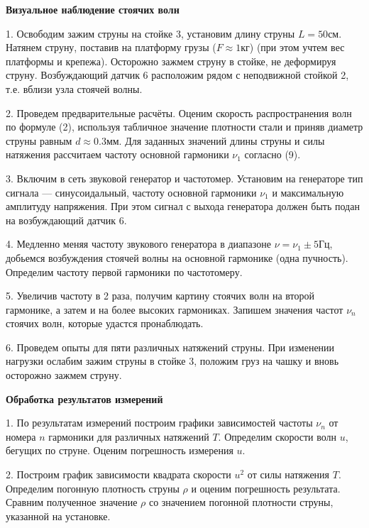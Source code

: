 \documentclass[14pt]{article}
\begin{document}
%
%

\vspace{1cm}
\textbf{Визуальное наблюдение стоячих волн}

1. Освободим зажим струны на стойке 3, установим длину струны $L = 50$см. Натянем струну, поставив на платформу грузы ($F \approx 1$кг) (при этом учтем вес платформы и крепежа). Осторожно зажмем струну в стойке, не деформируя струну. Возбуждающий датчик 6 расположим рядом с неподвижной стойкой 2, т.е. вблизи узла стоячей волны. 

2. Проведем предварительные расчёты. Оценим скорость распространения волн по формуле (2), используя табличное значение плотности стали и приняв диаметр струны равным $d \approx 0.3$мм. Для заданных значений длины струны и силы натяжения рассчитаем частоту основной гармоники $\nu_1$ согласно (9).

3. Включим в сеть звуковой генератор и частотомер. Установим на генераторе тип сигнала --- синусоидальный, частоту основной гармоники $\nu_1$ и максимальную амплитуду напряжения. При этом сигнал с выхода генератора должен быть подан на возбуждающий датчик 6.

4. Медленно меняя частоту звукового генератора в диапазоне $\nu = \nu_1 \pm 5$Гц, добьемся возбуждения стоячей волны на основной гармонике (одна пучность). Определим частоту первой гармоники по частотомеру. 

5. Увеличив частоту в 2 раза, получим картину стоячих волн на второй гармонике, а затем и на более высоких гармониках. Запишем значения частот $\nu_n$ стоячих волн, которые удастся пронаблюдать.


6. Проведем опыты для пяти различных натяжений струны. При изменении нагрузки ослабим зажим струны в стойке 3, положим груз на чашку и вновь осторожно зажмем струну.

\vspace{1cm}
\textbf{Обработка результатов измерений}

1. По результатам измерений построим графики зависимостей частоты $\nu_n$ от номера $n$ гармоники для различных натяжений $T$. Определим скорости волн $u$, бегущих по струне. Оценим погрешность измерения $u$.

2. Построим график зависимости квадрата скорости $u^2$ от силы натяжения $T$. Определим погонную плотность струны $\rho$ и оценим погрешность результата. Сравним полученное значение $\rho$ со значением погонной плотности струны, указанной на установке.
\end{document}
